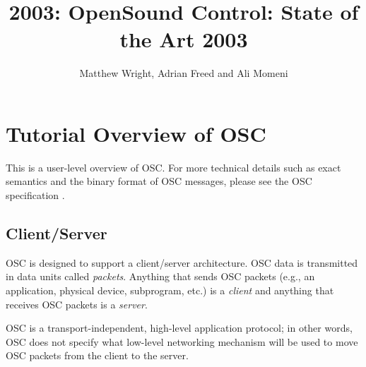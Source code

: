 
\graphicspath{ {mainmatter/Wright_2003/} }

\label{chapter:Wright_2003}
\title*{2003: OpenSound Control: State of the Art 2003}

\author{Matthew Wright, Adrian Freed and Ali Momeni}


%
%
\maketitle



\section{Tutorial Overview of OSC}

This is a user-level overview of OSC.  For more technical details such as exact
semantics and the binary format of OSC messages, please see the OSC specification
 \cite{Wright:2002}.

\subsection{Client/Server}

OSC is designed to support a client/server architecture.  OSC data is
transmitted in data units called \textit{packets}.  Anything that sends OSC
packets (e.g., an application, physical device, subprogram, etc.) is a
\textit{client} and anything that receives OSC packets is a \textit{server}.

OSC is a transport-independent, high-level application protocol; in other words,
OSC does not specify what low-level networking mechanism will be used to move OSC
packets from the client to the server.


